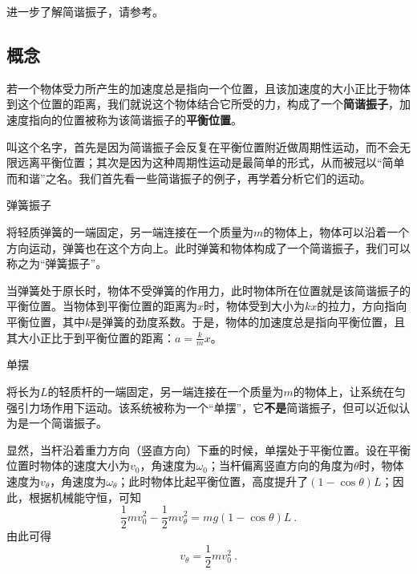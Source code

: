 
\begin{issues}
\issueDraft
\end{issues}

进一步了解简谐振子，请参考。


\subsection{概念}


若一个物体受力所产生的加速度总是指向一个位置，且该加速度的大小正比于物体到这个位置的距离，我们就说这个物体结合它所受的力，构成了一个\textbf{简谐振子}，加速度指向的位置被称为该简谐振子的\textbf{平衡位置}。

叫这个名字，首先是因为简谐振子会反复在平衡位置附近做周期性运动，而不会无限远离平衡位置；其次是因为这种周期性运动是最简单的形式，从而被冠以“简单而和谐”之名。我们首先看一些简谐振子的例子，再学着分析它们的运动。




\begin{example}{弹簧振子}

将轻质弹簧的一端固定，另一端连接在一个质量为$m$的物体上，物体可以沿着一个方向运动，弹簧也在这个方向上。此时弹簧和物体构成了一个简谐振子，我们可以称之为“弹簧振子”。

当弹簧处于原长时，物体不受弹簧的作用力，此时物体所在位置就是该简谐振子的平衡位置。当物体到平衡位置的距离为$x$时，物体受到大小为$kx$的拉力，方向指向平衡位置，其中$k$是弹簧的劲度系数。于是，物体的加速度总是指向平衡位置，且其大小正比于到平衡位置的距离：$a=\frac{k}{m}x$。

\end{example}


\begin{example}{单摆}

将长为$L$的轻质杆的一端固定，另一端连接在一个质量为$m$的物体上，让系统在匀强引力场作用下运动。该系统被称为一个“单摆”，它\textbf{不是}简谐振子，但可以近似认为是一个简谐振子。

显然，当杆沿着重力方向（竖直方向）下垂的时候，单摆处于平衡位置。设在平衡位置时物体的速度大小为$v_0$，角速度为$\omega_0$；当杆偏离竖直方向的角度为$\theta$时，物体速度为$v_\theta$，角速度为$\omega_\theta$；此时物体比起平衡位置，高度提升了$(1-\cos\theta)L$；因此，根据机械能守恒，可知
\begin{equation}
\frac{1}{2}mv_0^2-\frac{1}{2}mv_\theta^2 = mg(1-\cos\theta)L~. 
\end{equation}
由此可得
\begin{equation}
v_\theta = \frac{1}{2}mv_0^2 ~. 
\end{equation}

\end{example}



















